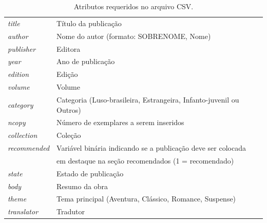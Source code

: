 \documentclass[a4paper]{article}
\begin{document}
\begin{table}[hc]
\centering
\caption{Atributos requeridos no arquivo CSV.\label{csv}}
\begin{tabular}{ll}
\hline
\textit{title} & Título da publicação \\
\textit{author} & Nome do autor (formato: SOBRENOME, Nome) \\
\textit{publisher} & Editora \\
\textit{year} & Ano de publicação \\
\textit{edition} & Edição \\
\textit{volume} & Volume \\
\textit{category} & Categoria (Luso-brasileira, Estrangeira, Infanto-juvenil ou Outros) \\
\textit{ncopy} & Número de exemplares a serem inseridos \\
\textit{collection} & Coleção \\
\textit{recommended} & Variável binária indicando se a publicação deve ser colocada \\
 & em destaque na seção recomendados (1 = recomendado) \\
\textit{state} & Estado de publicação \\
\textit{body} & Resumo da obra \\
\textit{theme} & Tema principal (Aventura, Clássico, Romance, Suspense) \\
\textit{translator} & Tradutor \\
\hline
\end{tabular}
\end{table}
\end{document}

